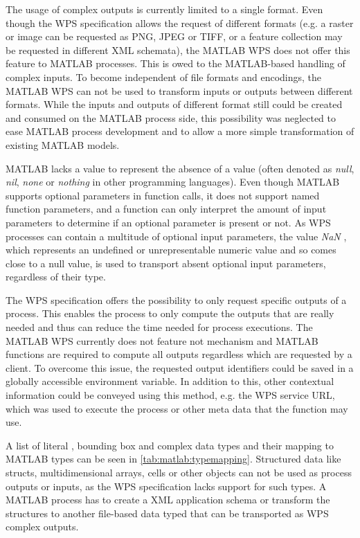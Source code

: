   The usage of complex outputs is currently limited to a single format. Even though the WPS specification allows the request of different formats (e.g. a raster or image can be requested as PNG, JPEG or TIFF, or a feature collection may be requested in different XML schemata), the MATLAB WPS does not offer this feature to MATLAB processes. This is owed to the MATLAB-based handling of complex inputs. To become independent of file formats and encodings, the MATLAB WPS can not be used to transform inputs or outputs between different formats. While the inputs and outputs of different format still could be created and consumed on the MATLAB process side, this possibility was neglected to ease MATLAB process development and to allow a more simple transformation of existing MATLAB models.

  MATLAB lacks a value to represent the absence of a value (often denoted as \emph{null}, \emph{nil}, \emph{none} or \emph{nothing} in other programming languages). Even though MATLAB supports optional parameters in function calls, it does not support named function parameters, and a function can only interpret the amount of input parameters to determine if an optional parameter is present or not. As WPS processes can contain a multitude of optional input parameters, the value \emph{NaN} \citep{ieee:754:2008}, which represents an undefined or unrepresentable numeric value and so comes close to a null value, is used to transport absent optional input parameters, regardless of their type.

  The WPS specification offers the possibility to only request specific outputs of a process. This enables the process to only compute the outputs that are really needed and thus can reduce the time needed for process executions. The MATLAB WPS currently does not feature not mechanism and MATLAB functions are required to compute all outputs regardless which are requested by a client.
  To overcome this issue, the requested output identifiers could be saved in a globally accessible environment variable. In addition to this, other contextual information could be conveyed using this method, e.g. the WPS service URL, which was used to execute the process or other meta data that the function may use.

  

  A list of literal \citep[based on][]{w3c:xmldatatypes}, bounding box and complex data types and their mapping to MATLAB types can be seen in \cref{tab:matlab:typemapping}. Structured data like structs, multidimensional arrays, cells or other objects can not be used as process outputs or inputs, as the \ac{WPS} specification lacks support for such types. A MATLAB process has to create a XML application schema or transform the structures to another file-based data typed that can be transported as WPS complex outputs.

